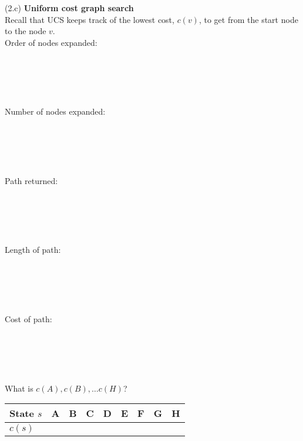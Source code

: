\documentclass{article}
\begin{document}
\noindent (2.c) \textbf{Uniform cost graph search}\\
Recall that UCS keeps track of the lowest cost, $c(v)$, to get from the start node to the node $v$.
~\\ 
Order of nodes expanded:\\
~\\
~\\
~\\
~\\
~\\
Number of nodes expanded:\\
~\\
~\\
~\\
~\\
~\\
Path returned:\\
~\\
~\\
~\\
~\\
~\\
Length of path:\\
~\\
~\\
~\\
~\\
~\\
Cost of path:\\
~\\
~\\
~\\
~\\
~\\
What is $c(A), c(B), \ldots c(H)$?
\renewcommand\arraystretch{1.5}
\begin{table}[tbh!]
\begin{center}
    \begin{tabular}{|p{2cm}| p{1cm}| p{1cm} | p{1cm}| p{1cm} | p{1cm}| p{1cm} | p{1cm}| p{1cm}|}
\hline
    State $s$  & A & B & C & D & E & F & G & H \\ \hline
    $c(s)$ &   &   &   &  &   &   &   &  \\
\hline
\end{tabular}
\end{center}
\end{table}
\end{document}
